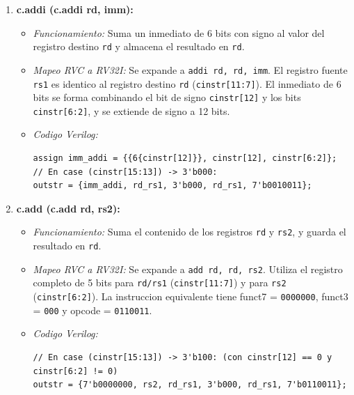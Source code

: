 \documentclass[12pt, a4paper]{article}
\begin{document}
\begin{enumerate}
    \item \textbf{c.addi (c.addi rd, imm):}
    \begin{itemize}
        \item \textit{Funcionamiento:} Suma un inmediato de 6 bits con signo al valor del registro destino \texttt{rd} y almacena el resultado en \texttt{rd}.
        \item \textit{Mapeo RVC a RV32I:} Se expande a \texttt{addi rd, rd, imm}. El registro fuente \texttt{rs1} es identico al registro destino \texttt{rd} (\texttt{cinstr[11:7]}). El inmediato de 6 bits se forma combinando el bit de signo \texttt{cinstr[12]} y los bits \texttt{cinstr[6:2]}, y se extiende de signo a 12 bits.
        \item \textit{Codigo Verilog:}
        \begin{lstlisting}[style=verilogstyle]
assign imm_addi = {{6{cinstr[12]}}, cinstr[12], cinstr[6:2]};
// En case (cinstr[15:13]) -> 3'b000:
outstr = {imm_addi, rd_rs1, 3'b000, rd_rs1, 7'b0010011};
        \end{lstlisting}
    \end{itemize}

    \item \textbf{c.add (c.add rd, rs2):}
    \begin{itemize}
        \item \textit{Funcionamiento:} Suma el contenido de los registros \texttt{rd} y \texttt{rs2}, y guarda el resultado en \texttt{rd}.
        \item \textit{Mapeo RVC a RV32I:} Se expande a \texttt{add rd, rd, rs2}. Utiliza el registro completo de 5 bits para \texttt{rd/rs1} (\texttt{cinstr[11:7]}) y para \texttt{rs2} (\texttt{cinstr[6:2]}). La instruccion equivalente tiene funct7 = \texttt{0000000}, funct3 = \texttt{000} y opcode = \texttt{0110011}.
        \item \textit{Codigo Verilog:}
        \begin{lstlisting}[style=verilogstyle]
// En case (cinstr[15:13]) -> 3'b100: (con cinstr[12] == 0 y cinstr[6:2] != 0)
outstr = {7'b0000000, rs2, rd_rs1, 3'b000, rd_rs1, 7'b0110011};
        \end{lstlisting}
    \end{itemize}


\end{enumerate}
\end{document}

